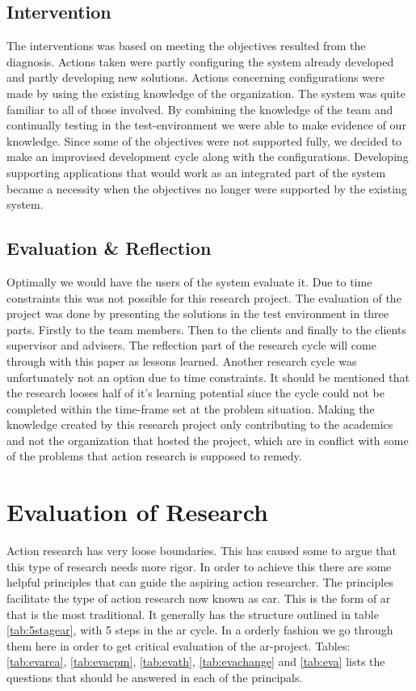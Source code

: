 \subsection{Intervention}
The interventions was based on meeting the objectives resulted from the diagnosis. 
Actions taken were partly configuring the system already developed and partly developing new solutions.
Actions concerning configurations were made by using the existing knowledge of the organization.
The system was quite familiar to all of those involved.
By combining the knowledge of the team and continually testing in the test-environment we were able to make evidence of our knowledge.
Since some of the objectives were not supported fully, we decided to make an improvised development cycle along with the configurations. 
Developing supporting applications that would work as an integrated part of the system became a necessity when the objectives no longer were supported by the existing system.
\subsection{Evaluation \& Reflection}
Optimally we would have the users of the system evaluate it. 
Due to time constraints this was not possible for this research project. 
The evaluation of the project was done by presenting the solutions in the test environment in three parts.
Firstly to the team members. Then to the clients and finally to the clients supervisor and advisers.
The reflection part of the research cycle will come through with this paper as lessons learned.
Another research cycle was unfortunately not an option due to time constraints.
It should be mentioned that the research looses half of it's learning potential since the cycle could not be completed within the time-frame set at the problem situation. 
Making the knowledge created by this research project only contributing to the academics and not the organization that hosted the project, which are in conflict with some of the problems that action research is supposed to remedy.

\newpage
\section{Evaluation of Research}
Action research has very loose boundaries. 
This has caused some to argue that this type of research needs more rigor. 
In order to achieve this there are some helpful principles that can guide the aspiring action researcher. 
The principles facilitate the type of action research now known as \gls{car}.
This is the form of \gls{ar} that is the most traditional. 
It generally has the structure outlined in table \ref{tab:5stagear}, with 5 steps in the \gls{ar} cycle.
In a orderly fashion we go through them here in order to get critical evaluation of the \gls{ar}-project. 
Tables: \ref{tab:evarca}, \ref{tab:evacpm}, \ref{tab:evath}, \ref{tab:evachange} and \ref{tab:eva} lists the questions that should be answered in each of the principals.
\newpage
